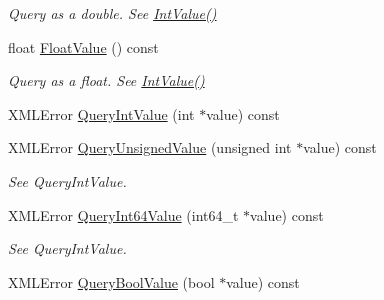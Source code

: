 \begin{DoxyCompactItemize}
\begin{DoxyCompactList}\small\item\em Query as a double. See \hyperlink{classCPlantBox_1_1tinyxml2_1_1XMLAttribute_a1a8936a7d4abbbe620eb1171c624ada9}{Int\+Value()} \end{DoxyCompactList}\item 
\mbox{\label{classCPlantBox_1_1tinyxml2_1_1XMLAttribute_a0b7c0cfb6f15e0fc8d43493ff8403d34}} 
float \hyperlink{classCPlantBox_1_1tinyxml2_1_1XMLAttribute_a0b7c0cfb6f15e0fc8d43493ff8403d34}{Float\+Value} () const
\begin{DoxyCompactList}\small\item\em Query as a float. See \hyperlink{classCPlantBox_1_1tinyxml2_1_1XMLAttribute_a1a8936a7d4abbbe620eb1171c624ada9}{Int\+Value()} \end{DoxyCompactList}\item 
X\+M\+L\+Error \hyperlink{classCPlantBox_1_1tinyxml2_1_1XMLAttribute_a43a2d2ae04950d78843895a59565dbfd}{Query\+Int\+Value} (int $\ast$value) const
\item 
\mbox{\label{classCPlantBox_1_1tinyxml2_1_1XMLAttribute_ac57bb6c3ecefa684fc53d1ac6bcef2de}} 
X\+M\+L\+Error \hyperlink{classCPlantBox_1_1tinyxml2_1_1XMLAttribute_ac57bb6c3ecefa684fc53d1ac6bcef2de}{Query\+Unsigned\+Value} (unsigned int $\ast$value) const
\begin{DoxyCompactList}\small\item\em See Query\+Int\+Value. \end{DoxyCompactList}\item 
\mbox{\label{classCPlantBox_1_1tinyxml2_1_1XMLAttribute_a9395ab56e25afa6cdf1ff7fc1deaa734}} 
X\+M\+L\+Error \hyperlink{classCPlantBox_1_1tinyxml2_1_1XMLAttribute_a9395ab56e25afa6cdf1ff7fc1deaa734}{Query\+Int64\+Value} (int64\+\_\+t $\ast$value) const
\begin{DoxyCompactList}\small\item\em See Query\+Int\+Value. \end{DoxyCompactList}\item 
\mbox{\label{classCPlantBox_1_1tinyxml2_1_1XMLAttribute_a5a537a1a7ee57ce80c78b97df535c6b2}} 
X\+M\+L\+Error \hyperlink{classCPlantBox_1_1tinyxml2_1_1XMLAttribute_a5a537a1a7ee57ce80c78b97df535c6b2}{Query\+Bool\+Value} (bool $\ast$value) const

\end{DoxyCompactItemize}
